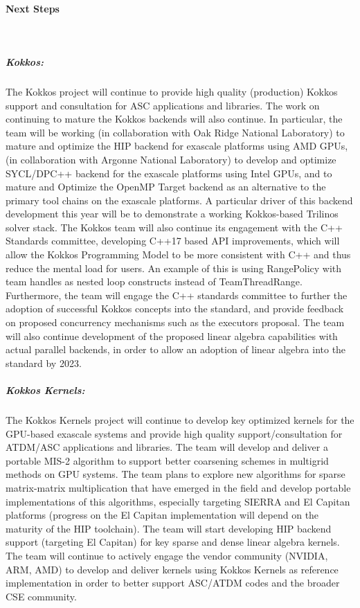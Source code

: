 \paragraph{Next Steps} \leavevmode \\


\subparagraph{Kokkos: } The Kokkos project will continue to provide high quality (production) Kokkos support and consultation for ASC applications and libraries. The work on continuing to mature the Kokkos backends will also continue.  In particular, the team will be working (in collaboration with Oak Ridge National Laboratory) to mature and optimize the HIP backend for exascale platforms using AMD GPUs, (in collaboration with Argonne National Laboratory) to develop and optimize SYCL/DPC++ backend for the exascale platforms using Intel GPUs, and to mature and Optimize the OpenMP Target backend as an alternative to the primary tool chains on the exascale platforms. A particular driver of this backend development this year will be to demonstrate a working Kokkos-based Trilinos solver stack.  The Kokkos team will also continue its engagement with the C++ Standards committee, developing C++17 based API improvements, which will allow the Kokkos Programming Model to be more consistent with C++ and thus reduce the mental load for users.   An example of this is using RangePolicy with team handles as nested loop constructs instead of TeamThreadRange. Furthermore, the team will engage the C++ standards committee to further the adoption of successful Kokkos concepts into the standard, and provide feedback on proposed concurrency mechanisms such as the executors proposal. The team will also continue development of the proposed linear algebra capabilities with actual parallel backends, in order to allow an adoption of linear algebra into the standard by 2023.

\subparagraph{Kokkos Kernels:} The Kokkos Kernels project will continue to develop key optimized kernels for the GPU-based exascale systems and provide high quality support/consultation for ATDM/ASC applications and libraries.  The team will develop and deliver a portable MIS-2 algorithm to support better coarsening schemes in multigrid methods on GPU systems.  The team plans to explore new algorithms for sparse matrix-matrix multiplication that have emerged in the field and develop portable implementations of this algorithms, especially targeting SIERRA and El Capitan platforms (progress on the El Capitan implementation will depend on the maturity of the HIP toolchain).  The team will start developing HIP backend support (targeting El Capitan) for key sparse and dense linear algebra kernels.  The team will continue to actively engage the vendor community (NVIDIA, ARM, AMD) to develop and deliver kernels using Kokkos Kernels as reference implementation in order to better support ASC/ATDM codes and the broader CSE community.
 
